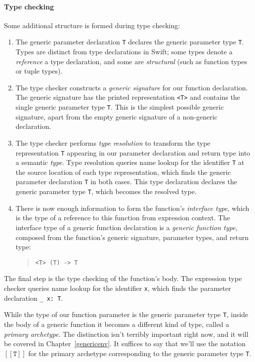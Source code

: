 \documentclass[a4paper,headsepline,bibliography=totoc,toc=flat,fleqn,twoside=semi]{scrbook}
\theoremstyle{definition}
\theoremstyle{definition}
\theoremstyle{definition}
\newcommand{\archetype}[1]{$[\![\texttt{#1}]\!]$}
\begin{document}
\paragraph{Type checking} Some additional structure is formed during type checking:
\begin{enumerate}
\item The generic parameter declaration \texttt{T} declares the generic parameter type \texttt{T}. Types are distinct from type declarations in Swift; some types denote a \emph{reference} a type declaration, and some are \emph{structural} (such as function types or tuple types).
\item The type checker constructs a \emph{generic signature} for our function declaration. The generic signature has the printed representation \texttt{<T>} and contains the single generic parameter type \texttt{T}. This is the simplest possible generic signature, apart from the empty generic signature of a non-generic declaration.

\item The type checker performs \emph{type resolution} to transform the type representation \texttt{T} appearing in our parameter declaration and return type into a semantic \emph{type}. Type resolution queries name lookup for the identifier \texttt{T} at the source location of each type representation, which finds the generic parameter declaration \texttt{T} in both cases. This type declaration declares the generic parameter type \texttt{T}, which becomes the resolved type.

\item There is now enough information to form the function's \emph{interface type}, which is the type of a reference to this function from expression context. The interface type of a generic function declaration is a \emph{generic function type}, composed from the function's generic signature, parameter types, and return type:
\begin{quote}
\begin{verbatim}
<T> (T) -> T
\end{verbatim}
\end{quote}
\end{enumerate}
The final step is the type checking of the function's body. The expression type checker queries name lookup for the identifier \texttt{x}, which finds the parameter declaration \verb|_ x: T|.

While the type of our function parameter is the generic parameter type \texttt{T}, inside the body of a generic function it becomes a different kind of type, called a \emph{primary archetype}. The distinction isn't terribly important right now, and it will be covered in Chapter~\ref{genericenv}. It suffices to say that we'll use the notation \archetype{T} for the primary archetype corresponding to the generic parameter type \texttt{T}.
\end{document}
